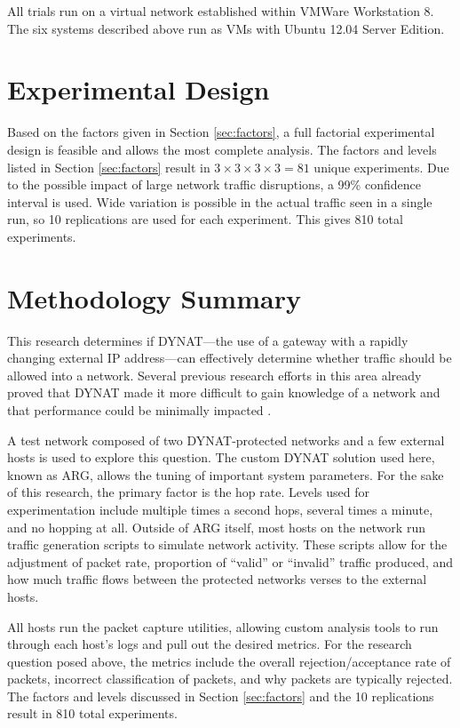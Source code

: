 \par {}

\par All trials run on a virtual network established within VMWare Workstation 8. The six systems described above run as \acp{VM} with Ubuntu 12.04 Server Edition.

\section{Experimental Design}
\label{sec:exp_design}
\par Based on the factors given in Section \ref{sec:factors}, a full factorial experimental design is feasible and allows the most complete analysis. The factors and levels listed in Section \ref{sec:factors} result in $3 \times 3 \times 3 \times 3 = 81$ unique experiments. Due to the possible impact of large network traffic disruptions, a 99\% confidence interval is used. Wide variation is possible in the actual traffic seen in a single run, so 10 replications are used for each experiment. This gives 810 total experiments.

\section{Methodology Summary}
\label{sec:method_summary}
\acresetall
\par This research determines if \ac{DYNAT}---the use of a gateway with a rapidly changing external \ac{IP} address---can effectively determine whether traffic should be allowed into a network. Several previous research efforts in this area already proved that \ac{DYNAT} made it more difficult to gain knowledge of a network \cite{BBNDYNAT} and that performance could be minimally impacted \cite{NAH}. 

\par A test network composed of two \ac{DYNAT}-protected networks and a few external hosts is used to explore this question. The custom \ac{DYNAT} solution used here, known as \ac{ARG}, allows the tuning of important system parameters. For the sake of this research, the primary factor is the hop rate. Levels used for experimentation include multiple times a second hops, several times a minute, and no hopping at all. Outside of \ac{ARG} itself, most hosts on the network run traffic generation scripts to simulate network activity. These scripts allow for the adjustment of packet rate, proportion of ``valid'' or ``invalid'' traffic produced, and how much traffic flows between the protected networks verses to the external hosts.

\par All hosts run the packet capture utilities, allowing custom analysis tools to run through each host's logs and pull out the desired metrics. For the research question posed above, the metrics include the overall rejection/acceptance rate of packets, incorrect classification of packets, and why packets are typically rejected. The factors and levels discussed in Section \ref{sec:factors} and the 10 replications result in 810 total experiments.

